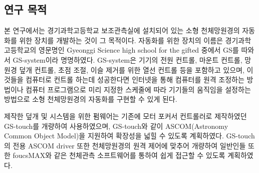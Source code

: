 \subsection{연구 목적}


본 연구에서는 경기과학고등학교 보조관측실에 설치되어 있는 소형 천체망원경의 자동화를 위한 장치를 개발하는 것이 그 목적이다. 자동화를 위한 장치의 이름은 경기과학고등학교의 영문명인 Gyeonggi Science high school for the gifted 중에서 GS를 따와서 GS-system이라 명명하였다. GS-system은 기기의 전원 컨트롤, 마운트 컨트롤, 망원경 덮개 컨트롤, 초점 조절, 이슬 제거를 위한 열선 컨트롤 등을 포함하고 있으며, 이것들을 컴퓨터로 컨트롤 하는데 성공한다면 인터넷을 통해 컴퓨터를 원격 조정하는 방법이나 컴퓨터 프로그램으로 미리 지정한 스케줄에 따라 기기들의 움직임을 설정하는 방법으로 소형 천체망원경의 자동화를 구현할 수 있게 된다. 

제작한 덮개 및 시스템을 위한 펌웨어는 기존에 모터 포커서 컨트롤러로 제작하였던 GS-touch를 개량하여 사용하였으며, GS-touch와 같이 ASCOM(Astronomy Common Object Model)을 지원하여 확장성을 넓힐 수 있도록 계획하였다. GS-touch의 전용 ASCOM driver 또한 천체망원경의 원격 제어에 맞추어 개량하여 일반인들 또한 foucsMAX와 같은 천체관측 소프트웨어를 통하여 쉽게 접근할 수 있도록 계획하였다.

\begin{comment}
이를 위해 해결해야 할 주요 문제는 다음과 같다.

\begin{itemize}
	
	\item{덮개는 바흐티노프 마스크를 정확하게 제어할 수 있는가?}\\[-34pt]
	\item{바흐티노프 마스크를 이용하여 초점을 정확하게 맞출 수 있는가?}\\[-34pt]
	\item{향상된 모터포커서를 이용하여 이들을 제어할 수 있는가?}
	
\end{itemize}
\end{comment}



\begin{comment}
제작한 모터 포커서 컨트롤러는 GS-touch로 명명하였다. GS-touch는 스테핑 모터를 구동할 수 있고 컴퓨터로 제어할 수 있도록 설계하였으며, 전용 ASCOM (Astronomy Common Object Model) dirver를 개발하여 ASCOM을 지원하는 천문 소프트웨어를 이용하여 쉽게 사용할 수 있도록 하였다.
\end{comment}



